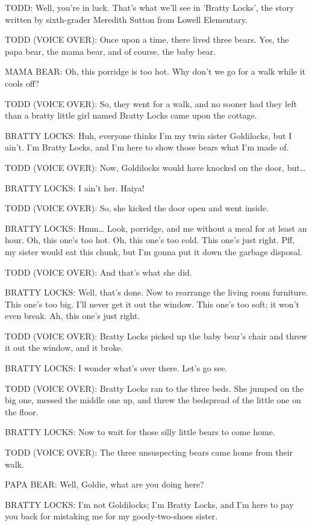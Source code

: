 TODD:
Well, you're in luck.
That's what we'll see in 'Bratty Locks', the story written by sixth-grader Meredith Sutton from Lowell Elementary.

TODD (VOICE OVER):
Once upon a time, there lived three bears.
Yes, the papa bear, the mama bear, and of course, the baby bear.

MAMA BEAR:
Oh, this porridge is too hot.
Why don't we go for a walk while it cools off?

TODD (VOICE OVER):
So, they went for a walk, and no sooner had they left than a bratty little girl named Bratty Locks came upon the cottage.

BRATTY LOCKS:
Huh, everyone thinks I'm my twin sister Goldilocks, but I ain't.
I'm Bratty Locks, and I'm here to show those bears what I'm made of.

TODD (VOICE OVER):
Now, Goldilocks would have knocked on the door, but\dots

BRATTY LOCKS:
I ain't her. Haiya!

TODD (VOICE OVER):
So, she kicked the door open and went inside.

BRATTY LOCKS:
Hmm\dots
Look, porridge, and me without a meal for at least an hour.
Oh, this one's too hot.
Oh, this one's too cold.
This one's just right.
Pff, my sister would eat this chunk, but I'm gonna put it down the garbage disposal.

TODD (VOICE OVER):
And that's what she did.

BRATTY LOCKS:
Well, that's done.
Now to rearrange the living room furniture.
This one's too big.
I'll never get it out the window.
This one's too soft; it won't even break.
Ah, this one's just right.

TODD (VOICE OVER):
Bratty Locks picked up the baby bear's chair and threw it out the window, and it broke.

BRATTY LOCKS:
I wonder what's over there.
Let's go see.

TODD (VOICE OVER):
Bratty Locks ran to the three beds.
She jumped on the big one, messed the middle one up, and threw the bedspread of the little one on the floor.

BRATTY LOCKS:
Now to wait for those silly little bears to come home.

TODD (VOICE OVER):
The three unsuspecting bears came home from their walk.

PAPA BEAR:
Well, Goldie, what are you doing here?

BRATTY LOCKS:
I'm not Goldilocks; I'm Bratty Locks, and I'm here to pay you back for mistaking me for my goody-two-shoes sister.

